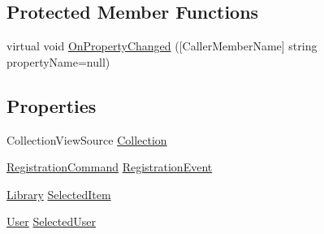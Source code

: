 \subsection*{Protected Member Functions}
\begin{DoxyCompactItemize}
\item 
virtual void \mbox{\hyperlink{class_easy_library_application_1_1_w_p_f_1_1_view_model_1_1_registration_view_model_afdbb68884f20a5485cd4e942828b35d7}{On\+Property\+Changed}} (\mbox{[}Caller\+Member\+Name\mbox{]} string property\+Name=null)
\end{DoxyCompactItemize}
\subsection*{Properties}
\begin{DoxyCompactItemize}
\item 
Collection\+View\+Source \mbox{\hyperlink{class_easy_library_application_1_1_w_p_f_1_1_view_model_1_1_registration_view_model_ae28baf1e93bde25217cd1694d514df8f}{Collection}}
\item 
\mbox{\hyperlink{class_easy_library_application_1_1_w_p_f_1_1_commands_1_1_registration_command}{Registration\+Command}} \mbox{\hyperlink{class_easy_library_application_1_1_w_p_f_1_1_view_model_1_1_registration_view_model_aa9d455e4de58ae1280d82d119daf7cae}{Registration\+Event}}
\item 
\mbox{\hyperlink{class_easy_library_application_1_1_w_p_f_1_1_model_1_1_library}{Library}} \mbox{\hyperlink{class_easy_library_application_1_1_w_p_f_1_1_view_model_1_1_registration_view_model_aa07c845cd143e9a201516eb82079f3c9}{Selected\+Item}}
\item 
\mbox{\hyperlink{class_easy_library_application_1_1_w_p_f_1_1_model_1_1_user}{User}} \mbox{\hyperlink{class_easy_library_application_1_1_w_p_f_1_1_view_model_1_1_registration_view_model_a2611d193fa9dcbc156256fa3cd85de3b}{Selected\+User}}
\end{DoxyCompactItemize}
